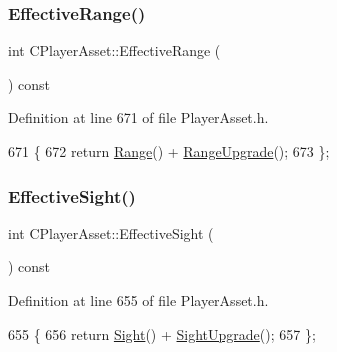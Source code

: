 \subsubsection{\texorpdfstring{Effective\+Range()}{EffectiveRange()}}
{\footnotesize\ttfamily int C\+Player\+Asset\+::\+Effective\+Range (\begin{DoxyParamCaption}{ }\end{DoxyParamCaption}) const\hspace{0.3cm}{\ttfamily [inline]}}



Definition at line 671 of file Player\+Asset.\+h.


\begin{DoxyCode}
671                                   \{
672             \textcolor{keywordflow}{return} \hyperlink{classCPlayerAsset_a717695212dd7159bd0b6e97d4ae5cf9b}{Range}() + \hyperlink{classCPlayerAsset_aad35da7eb13a1d5830471a0f6de5090e}{RangeUpgrade}();
673         \};
\end{DoxyCode}
\hypertarget{classCPlayerAsset_a69a1226429ded98b31fde2623d0058bf}{}\label{classCPlayerAsset_a69a1226429ded98b31fde2623d0058bf} 
\subsubsection{\texorpdfstring{Effective\+Sight()}{EffectiveSight()}}
{\footnotesize\ttfamily int C\+Player\+Asset\+::\+Effective\+Sight (\begin{DoxyParamCaption}{ }\end{DoxyParamCaption}) const\hspace{0.3cm}{\ttfamily [inline]}}



Definition at line 655 of file Player\+Asset.\+h.


\begin{DoxyCode}
655                                   \{
656             \textcolor{keywordflow}{return} \hyperlink{classCPlayerAsset_ac732622598cbd05dd2ec9233468e2b07}{Sight}() + \hyperlink{classCPlayerAsset_aaa297dbacfa25d61ce2b3498ed139c5b}{SightUpgrade}();
657         \};
\end{DoxyCode}
\hypertarget{classCPlayerAsset_af6d10fcbbd9cc861ced9ba3a85d387ab}{}\label{classCPlayerAsset_af6d10fcbbd9cc861ced9ba3a85d387ab} 
